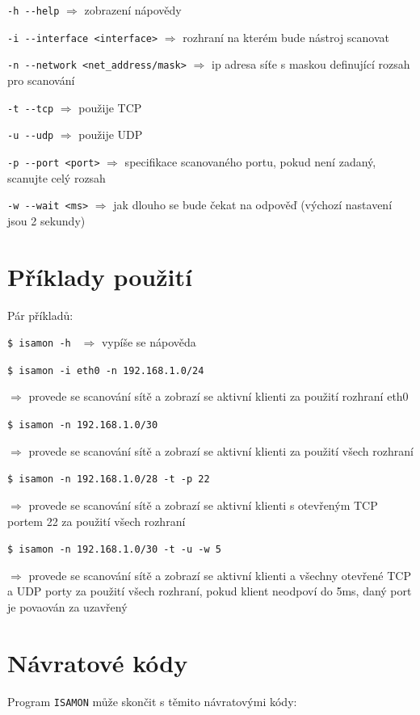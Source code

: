 \texttt{-h -{}-help} $\Rightarrow$ zobrazení nápovědy

\texttt{-i -{}-interface <interface>} $\Rightarrow$ rozhraní na kterém bude nástroj scanovat

\texttt{-n -{}-network <net\_address/mask>} $\Rightarrow$ ip adresa síťe s maskou definující rozsah pro scanování 

\texttt{-t -{}-tcp} $\Rightarrow$ použije TCP 

\texttt{-u -{}-udp} $\Rightarrow$ použije UDP 

\texttt{-p -{}-port <port>} $\Rightarrow$ specifikace scanovaného portu, pokud není zadaný, scanujte celý rozsah

\texttt{-w -{}-wait <ms>} $\Rightarrow$ jak dlouho se bude čekat na odpověď (výchozí nastavení jsou 2 sekundy)
\newline

\section{Příklady použití}
Pár příkladů:

\texttt{\$ isamon -h } $\Rightarrow$ vypíše se nápověda
\newline

\texttt{\$ isamon -i eth0 -n 192.168.1.0/24} 

$\Rightarrow$ provede se scanování sítě a zobrazí se aktivní klienti za použití rozhraní eth0
\newline

\texttt{\$ isamon -n 192.168.1.0/30}

$\Rightarrow$ provede se scanování sítě a zobrazí se aktivní klienti za použití všech rozhraní 
\newline

\texttt{\$ isamon -n 192.168.1.0/28 -t -p 22}

$\Rightarrow$ provede se scanování sítě a zobrazí se aktivní klienti s otevřeným TCP portem 22 za použití všech rozhraní 
\newline

\texttt{\$ isamon -n 192.168.1.0/30 -t -u -w 5}

$\Rightarrow$ provede se scanování sítě a zobrazí se aktivní klienti a všechny otevřené TCP a UDP porty za použití všech rozhraní, pokud klient neodpoví do 5ms, daný port je povaován za uzavřený

\section{Návratové kódy}
Program \texttt{ISAMON} může skončit s těmito návratovými kódy:

